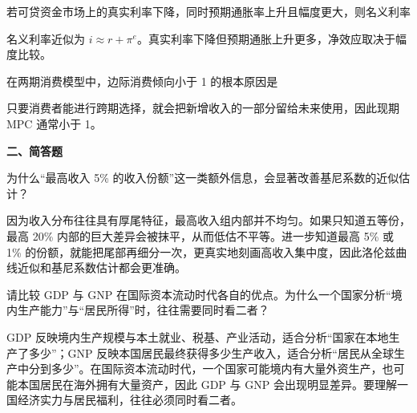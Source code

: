 \begin{question}
若可贷资金市场上的真实利率下降，同时预期通胀率上升且幅度更大，则名义利率
\begin{choiceoptions}[2]
\end{choiceoptions}
\begin{solution}
名义利率近似为 $i\approx r+\pi^e$。真实利率下降但预期通胀上升更多，净效应取决于幅度比较。
\end{solution}
\end{question}

\begin{question}
在两期消费模型中，边际消费倾向小于 1 的根本原因是
\begin{choiceoptions}[1]
\end{choiceoptions}
\begin{solution}
只要消费者能进行跨期选择，就会把新增收入的一部分留给未来使用，因此现期 MPC 通常小于 1。
\end{solution}
\end{question}

\textbf{二、简答题}

\begin{question}
为什么“最高收入 5\% 的收入份额”这一类额外信息，会显著改善基尼系数的近似估计？
\begin{solution}
因为收入分布往往具有厚尾特征，最高收入组内部并不均匀。如果只知道五等份，最高 20\% 内部的巨大差异会被抹平，从而低估不平等。进一步知道最高 5\% 或 1\% 的份额，就能把尾部再细分一次，更真实地刻画高收入集中度，因此洛伦兹曲线近似和基尼系数估计都会更准确。\end{solution}
\end{question}

\begin{question}
请比较 GDP 与 GNP 在国际资本流动时代各自的优点。为什么一个国家分析“境内生产能力”与“居民所得”时，往往需要同时看二者？
\begin{solution}
GDP 反映境内生产规模与本土就业、税基、产业活动，适合分析“国家在本地生产了多少”；GNP 反映本国居民最终获得多少生产收入，适合分析“居民从全球生产中分到多少”。在国际资本流动时代，一个国家可能境内有大量外资生产，也可能本国居民在海外拥有大量资产，因此 GDP 与 GNP 会出现明显差异。要理解一国经济实力与居民福利，往往必须同时看二者。\end{solution}
\end{question}

